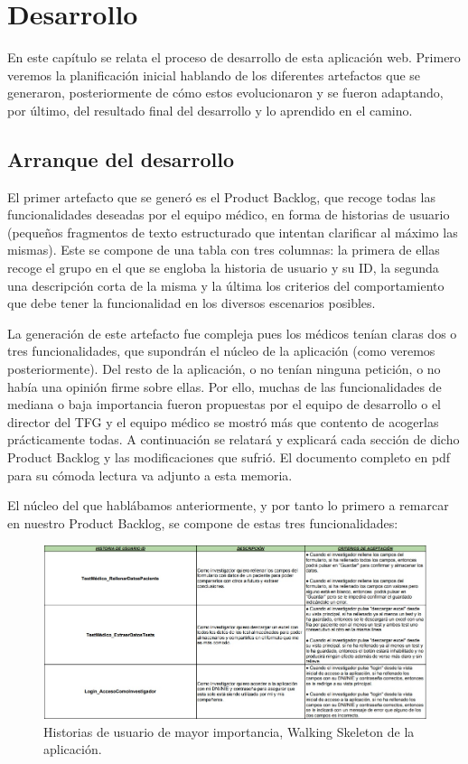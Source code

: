 \chapter{Desarrollo}

En este capítulo se relata el proceso de desarrollo de esta aplicación web. Primero veremos la planificación inicial hablando de los diferentes artefactos que se generaron, posteriormente de cómo estos evolucionaron y se fueron adaptando, por último, del resultado final del desarrollo y lo aprendido en el camino.

\section{Arranque del desarrollo}

El primer artefacto que se generó es el Product Backlog, que recoge todas las funcionalidades deseadas por el equipo médico, en forma de historias de usuario (pequeños fragmentos de texto estructurado que intentan clarificar al máximo las mismas). Este se compone de una tabla con tres columnas: la primera de ellas recoge el grupo en el que se engloba la historia de usuario y su ID, la segunda una descripción corta de la misma y la última los criterios del comportamiento que debe tener la funcionalidad en los diversos escenarios posibles.
\newline

La generación de este artefacto fue compleja pues los médicos tenían claras dos o tres funcionalidades, que supondrán el núcleo de la aplicación (como veremos posteriormente). Del resto de la aplicación, o no tenían ninguna petición, o no había una opinión firme sobre ellas. Por ello, muchas de las funcionalidades de mediana o baja importancia fueron propuestas por el equipo de desarrollo o el director del TFG y el equipo médico se mostró más que contento de acogerlas prácticamente todas. A continuación se relatará y explicará cada sección de dicho Product Backlog y las modificaciones que sufrió. El documento completo en pdf para su cómoda lectura va adjunto a esta memoria.
\newpage

El núcleo del que hablábamos anteriormente, y por tanto lo primero a remarcar en nuestro Product Backlog, se compone de estas tres funcionalidades:
\newline

 \begin{figure}[h]
    \centering
     \includegraphics[width=1\textwidth]{images/historiasUsuario-1.jpg}
    \caption{Historias de usuario de mayor importancia, Walking Skeleton de la aplicación.}
\end{figure}


